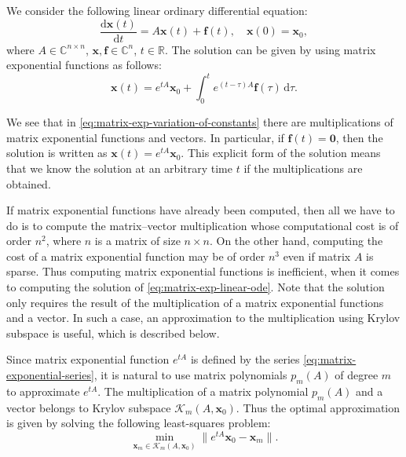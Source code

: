 {We consider the following linear ordinary differential equation:}
\begin{equation}\label{eq:matrix-exp-linear-ode}\frac{\mathrm{d}\boldsymbol{x}(t)}{\mathrm{d}t}=A\boldsymbol{x}(t)+\boldsymbol{f}(t),\quad\boldsymbol{x}(0)=\boldsymbol{x}_0,\end{equation}
{where $A\in\mathbb{C}^{n\times n}$, $\boldsymbol{x},\boldsymbol{f}\in\mathbb{C}^n$, $t\in\mathbb{R}$. The solution can be given by using matrix exponential functions as follows:}
\begin{equation}\label{eq:matrix-exp-variation-of-constants}\boldsymbol{x}(t)=e^{tA}\boldsymbol{x}_0+\int_0^t e^{(t-\tau)A}\boldsymbol{f}(\tau)\,\mathrm{d}\tau.\end{equation}

{We see that in \eqref{eq:matrix-exp-variation-of-constants} there are multiplications of matrix exponential functions and vectors. In particular, if $\boldsymbol{f}(t)=\boldsymbol{0}$, then the solution is written as $\boldsymbol{x}(t)=e^{tA}\boldsymbol{x}_0$. This explicit form of the solution means that we know the solution at an arbitrary time $t$ if the multiplications are obtained.}

{If matrix exponential functions have already been computed, then all we have to do is to compute the matrix--vector multiplication whose computational cost is of order $n^2$, where $n$ is a matrix of size $n\times n$. On the other hand, computing the cost of a matrix exponential function may be of order $n^3$ even if matrix $A$ is sparse. Thus computing matrix exponential functions is inefficient, when it comes to computing the solution of \eqref{eq:matrix-exp-linear-ode}. Note that the solution only requires the result of the multiplication of a matrix exponential functions and a vector. In such a case, an approximation to the multiplication using Krylov subspace is useful, which is described below.}

{Since matrix exponential function $e^{tA}$ is defined by the series \eqref{eq:matrix-exponential-series}, it is natural to use matrix polynomials $p_m(A)$ of degree $m$ to approximate $e^{tA}$. The multiplication of a matrix polynomial $p_m(A)$ and a vector belongs to Krylov subspace $\mathcal{K}_m(A,\boldsymbol{x}_0)$. Thus the optimal approximation is given by solving the following least-squares problem:}
\begin{equation}\label{eq:matrix-exp-krylov-least-squares}\min_{\boldsymbol{x}_m\in\mathcal{K}_m(A,\boldsymbol{x}_0)}\|e^{tA}\boldsymbol{x}_0-\boldsymbol{x}_m\|.\end{equation}

